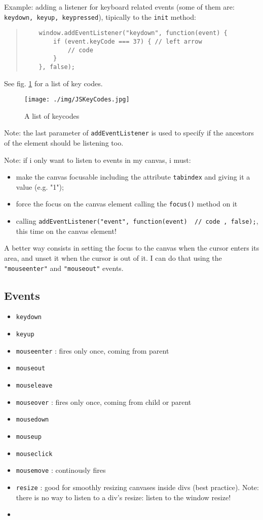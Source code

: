 \documentclass[a4paper,11pt]{book}
\begin{document}
Example: adding a listener for keyboard related events (some of them are:
\texttt{keydown, keyup, keypressed}), tipically to the \texttt{init} method:
\begin{verse}
\begin{verbatim}
	window.addEventListener("keydown", function(event) {
		if (event.keyCode === 37) { // left arrow
			// code
		}
	}, false);
\end{verbatim}
\end{verse}
See fig. \ref{fig:keycodes} for a list of key codes.
\begin{figure}[h]
\caption{A list of keycodes} \label{fig:keycodes}
\centering
\texttt{[image: ./img/JSKeyCodes.jpg]}
\end{figure}

Note: the last parameter of \texttt{addEventListener} is used to specify if
the ancestors of the element should be listening too.

Note: if i only want to listen to events in my canvas, i must:
\begin{itemize}
\item make the canvas focusable including the attribute \texttt{tabindex} and giving
it a value (e.g. "1");
\item force the focus on the canvas element calling the \texttt{focus()} method on it
\item calling \texttt{addEventListener("event", function(event) { // code }, false);},
		this time on the canvas element!
\end{itemize}
A better way consists in setting the focus to the canvas when the cursor enters its
area, and unset it when the cursor is out of it. I can do that using the
\texttt{"mouseenter"} and \texttt{"mouseout"} events.


\subsection{Events}
\begin{itemize}
\item \texttt{keydown}
\item \texttt{keyup}
\item \texttt{mouseenter} : fires only once, coming from parent
\item \texttt{mouseout}
\item \texttt{mouseleave}
\item \texttt{mouseover} : fires only once, coming from child or parent
\item \texttt{mousedown}
\item \texttt{mouseup}
\item \texttt{mouseclick}
\item \texttt{mousemove} : continously fires
\item \texttt{resize} : good for smoothly resizing canvases inside divs (best practice).
	Note: there is no way to listen to a div's resize: listen to the window resize!
\item \texttt{}
\end{itemize}
\end{document}
